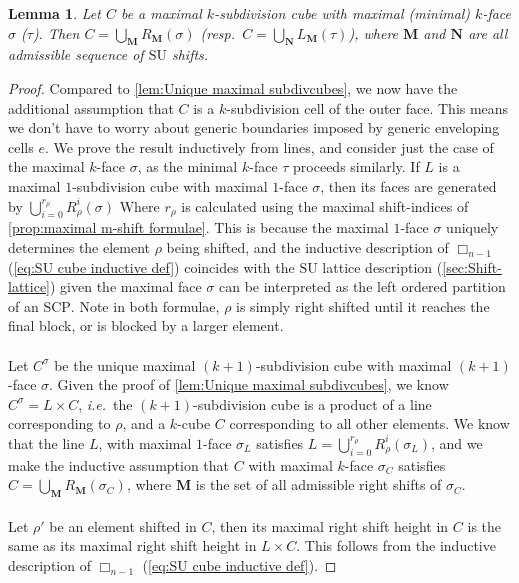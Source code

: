 \documentclass{amsart}
\newtheorem{lemma}[theorem]{Lemma}
\theoremstyle{definition}
\newcommand{\ie}{\textit{i.e.}~} %
\newcommand{\resp}{resp.~} %
\newcommand{\SU}{\mathrm{SU}}
\newcommand{\SCP}{\mathrm{SCP}}
\newcommand{\divcube}[1]{\Box_{#1}}
\begin{document}
\begin{lemma}
Let $C$ be a maximal $k$-subdivision cube with  maximal (minimal) $k$-face $\sigma$ ($\tau$).
Then $C = \bigcup_{\mathbf{M}} R_\mathbf{M}(\sigma)$ (\resp $C=\bigcup_{\mathbf{N}} L_\mathbf{M}(\tau)$), where $\mathbf{M}$ and $\mathbf{N}$ are all admissible sequence of $\SU$ shifts.

\end{lemma}
\begin{proof}
Compared to \cref{lem:Unique maximal subdivcubes}, we now have the additional assumption that $C$ is a $k$-subdivision cell of the outer face.
This means we don't have to worry about generic boundaries imposed by generic enveloping cells $e$.
We prove the result inductively from lines, and consider just the case of the maximal $k$-face $\sigma$, as the minimal $k$-face $\tau$ proceeds similarly.
If $L$ is a maximal $1$-subdivision cube with maximal $1$-face $\sigma$, then its faces are generated by $\bigcup_{i=0}^{r_\rho} R_\rho^i(\sigma)$
Where $r_\rho$ is calculated using the maximal shift-indices of \cref{prop:maximal m-shift formulae}.
This is because the maximal $1$-face $\sigma$ uniquely determines the element $\rho$ being shifted, and the inductive description of $\divcube{n-1}$ (\cref{eq:SU cube inductive def}) coincides with the $\SU$ lattice description (\cref{sec:Shift-lattice}) given the maximal face $\sigma$ can be interpreted as the left ordered partition of an $\SCP$.
Note in both formulae, $\rho$ is simply right shifted until it reaches the final block, or is blocked by a larger element.
\\\\
Let $C^\sigma$ be the unique maximal $(k+1)$-subdivision cube with maximal $(k+1)$-face $\sigma$.
Given the proof of \cref{lem:Unique maximal subdivcubes}, we know $C^\sigma = L\times C$, \ie the $(k+1)$-subdivision cube is a product of a line corresponding to $\rho$, and a $k$-cube $C$ corresponding to all other elements.
We know that the line $L$, with maximal $1$-face $\sigma_L$ satisfies $L=\bigcup_{i=0}^{r_\rho} R_\rho^i(\sigma_L)$, and we make the inductive assumption that $C$ with maximal $k$-face $\sigma_C$ satisfies $C = \bigcup_{\mathbf{M}}R_\mathbf{M}(\sigma_C)$, where $\mathbf{M}$ is the set of all admissible right shifts of $\sigma_C$.
\\\\
Let $\rho'$ be an element shifted in $C$, then its maximal right shift height in $C$ is the same as its maximal right shift height in $L\times C$.
This follows from the inductive description of $\divcube{n-1}$ (\cref{eq:SU cube inductive def}).

\end{proof}
\end{document}
